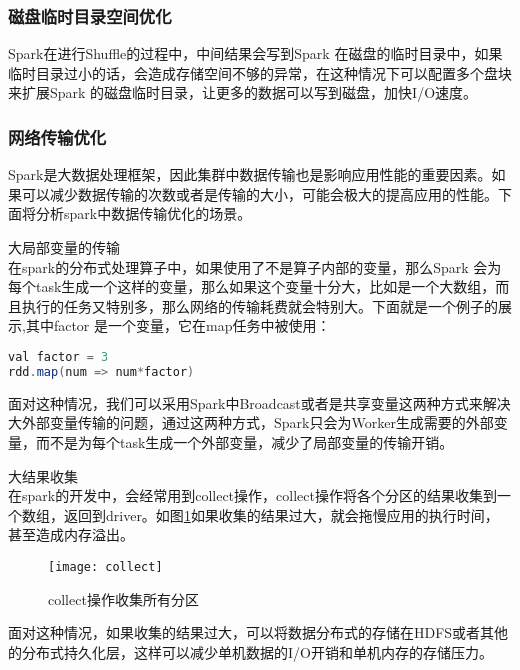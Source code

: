 \subsubsection{磁盘临时目录空间优化}
Spark在进行Shuffle的过程中，中间结果会写到Spark 在磁盘的临时目录中，如果临时目录过小的话，会造成存储空间不够的异常，在这种情况下可以配置多个盘块来扩展Spark 的磁盘临时目录，让更多的数据可以写到磁盘，加快I/O速度。
\subsubsection{网络传输优化}
Spark是大数据处理框架，因此集群中数据传输也是影响应用性能的重要因素。如果可以减少数据传输的次数或者是传输的大小，可能会极大的提高应用的性能。下面将分析spark中数据传输优化的场景。
\begin{compactenum}
\item 大局部变量的传输\\在spark的分布式处理算子中，如果使用了不是算子内部的变量，那么Spark 会为每个task生成一个这样的变量，那么如果这个变量十分大，比如是一个大数组，而且执行的任务又特别多，那么网络的传输耗费就会特别大。下面就是一个例子的展示,其中factor 是一个变量，它在map任务中被使用：
\begin{lstlisting}[language=Java,numbers=none,frame=none]
val factor = 3
rdd.map(num => num*factor)
\end{lstlisting}

面对这种情况，我们可以采用Spark中Broadcast或者是共享变量这两种方式来解决大外部变量传输的问题，通过这两种方式，Spark只会为Worker生成需要的外部变量，而不是为每个task生成一个外部变量，减少了局部变量的传输开销。
\item 大结果收集\\在spark的开发中，会经常用到collect操作，collect操作将各个分区的结果收集到一个数组，返回到driver。如图\ref{fig:collect}如果收集的结果过大，就会拖慢应用的执行时间，甚至造成内存溢出。
\begin{figure}[htp]
\centering
\texttt{[image: collect]}
\caption{collect操作收集所有分区}
\label{fig:collect}
\end{figure}
面对这种情况，如果收集的结果过大，可以将数据分布式的存储在HDFS或者其他的分布式持久化层，这样可以减少单机数据的I/O开销和单机内存的存储压力。
\end{compactenum}
